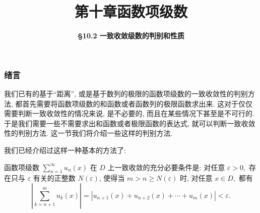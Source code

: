 \everymath{\displaystyle}



\title[第十章\\
函数项级数]{\texorpdfstring{\LARGE \bfseries 第十章\quad 函数项级数}{第十章 函数项级数}} %
\author[\smaller \S 10.2\\
一致收敛级数的判别和性质] %
{\Large \bfseries \S 10.2 一致收敛级数的判别和性质}
\date{}





\begin{frame}

\titlepage %

\end{frame}



\begin{frame}
\frametitle{绪言}

我们已有的基于``距离'', 或是基于数列的极限的函数项级数的一致收敛性的判别方法, 都首先需要将函数项级数的和函数或者函数列的极限函数求出来. 这对于仅仅需要判断一致收敛性的情况来说, 是不必要的, 而且在某些情况下甚至是不可行的. 于是我们需要一些不需要求出和函数或者极限函数的表达式, 就可以判断一致收敛性的判别方法. 这一节我们将介绍一些这样的判别方法.

\pause
\vspace{1em}

我们已经介绍过这样一种基本的方法了:

\begin{thm}
函数项级数 $\displaystyle \sum_{n=1}^\infty u_n(x)$ 在 $D$ 上一致收敛的充分必要条件是: 对任意 $\varepsilon > 0,$ 存在只与 $\varepsilon$ 有关的正整数 $N(\varepsilon)$, 使得当 $m > n \geqslant N(\varepsilon)$ 时, 对任意 $x \in D,$ 都有
\begin{equation*}
\left| \sum_{k=n+1}^m u_k(x) \right| = \left| u_{n+1}(x) + u_{n+2}(x) + \cdots + u_m(x) \right| < \varepsilon.
\end{equation*}
\end{thm}

\end{frame}

